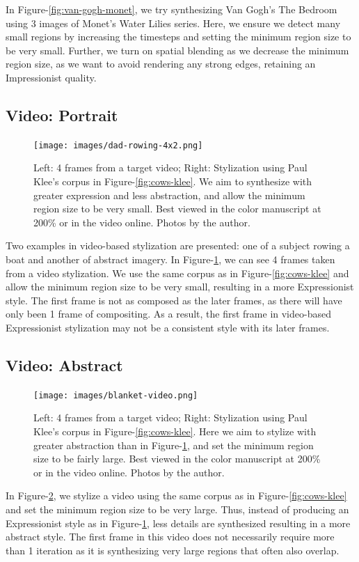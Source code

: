 \documentclass[a4paper,10pt,final]{ThesisStyle}
\begin{document}
In Figure-\ref{fig:van-gogh-monet}, we try synthesizing Van Gogh's The Bedroom using 3 images of Monet's Water Lilies series.  Here, we ensure we detect many small regions by increasing the timesteps and setting the minimum region size to be very small.  Further, we turn on spatial blending as we decrease the minimum region size, as we want to avoid rendering any strong edges, retaining an Impressionist quality.
\subsection{Video: Portrait}
\begin{figure}[ht]
  \centering
  \texttt{[image: images/dad-rowing-4x2.png]}
  \caption{Left: 4 frames from a target video; Right: Stylization using Paul Klee's corpus in Figure-\ref{fig:cows-klee}.  We aim to synthesize with greater expression and less abstraction, and allow the minimum region size to be very small. Best viewed in the color manuscript at 200\% or in the video online. Photos by the author.}
  \label{fig:rowing}
\end{figure}
Two examples in video-based stylization are presented: one of a subject rowing a boat and another of abstract imagery.  In Figure-\ref{fig:rowing}, we can see 4 frames taken from a video stylization.  We use the same corpus as in Figure-\ref{fig:cows-klee} and allow the minimum region size to be very small, resulting in a more Expressionist style.  The first frame is not as composed as the later frames, as there will have only been 1 frame of compositing.  As a result, the first frame in video-based Expressionist stylization may not be a consistent style with its later frames.
\subsection{Video: Abstract}\vspace{-0.4em}
\begin{figure}[ht]
  \centering
  \texttt{[image: images/blanket-video.png]}
  \caption{Left: 4 frames from a target video; Right: Stylization using Paul Klee's corpus in Figure-\ref{fig:cows-klee}.  Here we aim to stylize with greater abstraction than in Figure-\ref{fig:rowing}, and set the minimum region size to be fairly large. Best viewed in the color manuscript at 200\% or in the video online.   Photos by the author.}
  \label{fig:blanket-video}
\end{figure}
In Figure-\ref{fig:blanket-video}, we stylize a video using the same corpus as in Figure-\ref{fig:cows-klee} and set the minimum region size to be very large.  Thus, instead of producing an Expressionist style as in Figure-\ref{fig:rowing}, less details are synthesized resulting in a more abstract style.  The first frame in this video does not necessarily require more than 1 iteration as it is synthesizing very large regions that often also overlap.
\end{document}

